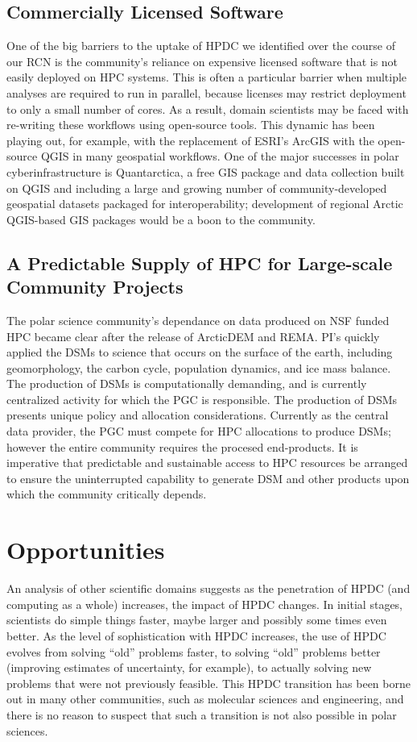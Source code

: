 \documentclass[10pt,letterpaper,draft]{article}
\begin{document}
\subsection*{Commercially Licensed Software}
One of the big barriers to the uptake of HPDC we identified over the course of our RCN is the community's reliance on expensive licensed software that is not easily deployed on HPC systems. This is often a particular barrier when multiple analyses are required to run in parallel, because licenses may restrict deployment to only a small number of cores. As a result, domain scientists may be faced with re-writing these workflows using open-source tools. This dynamic has been playing out, for example, with the replacement of ESRI's ArcGIS with the open-source QGIS in many geospatial workflows. One of the major successes in polar cyberinfrastructure is Quantarctica, a free GIS package and data collection built on QGIS and including a large and growing number of community-developed geospatial datasets packaged for interoperability; development of regional Arctic QGIS-based GIS packages would be a boon to the community.

\subsection*{A Predictable Supply of HPC for Large-scale Community Projects}
The polar science community's dependance on data produced on NSF funded HPC became clear after the release of ArcticDEM and REMA.  PI's quickly applied the DSMs to science that occurs on the surface of the earth, including geomorphology, the carbon cycle, population dynamics, and ice mass balance.  The production of DSMs is computationally demanding, and is currently centralized activity for which the PGC is responsible. The production of DSMs presents unique policy and allocation considerations.  Currently as the central data provider, the PGC must compete for HPC allocations to produce DSMs; however the entire community  requires the procesed end-products.  It is imperative that predictable and sustainable access to HPC resources be arranged to ensure the uninterrupted capability to generate DSM and other products upon which the community critically depends. 

\section*{Opportunities}
An analysis of other scientific domains suggests as the penetration of HPDC (and computing as a whole) increases, the impact of HPDC changes. In initial stages, scientists do simple things faster, maybe larger and possibly some times even better. As the level of sophistication with HPDC increases, the use of HPDC evolves from solving ``old'' problems faster, to solving ``old'' problems better (improving estimates of uncertainty, for example), to actually solving new problems that were not previously feasible. This HPDC transition has been borne out in many other communities, such as molecular sciences and engineering, and there is no reason to suspect that such a transition is not also possible in polar sciences. 
\end{document}
